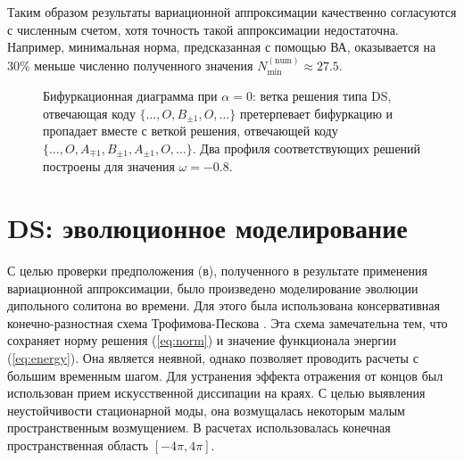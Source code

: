 Таким образом результаты вариационной аппроксимации качественно согласуются с численным счетом, хотя точность такой аппроксимации недостаточна.
Например, минимальная норма, предсказанная с помощью ВА, оказывается на $30\%$ меньше численно полученного значения $N_{\mathrm{min}}^{\mathrm{(num)}} \approx 27.5$.
%
\begin{figure}
\caption{Бифуркационная диаграмма при $\alpha = 0$: ветка решения типа DS, отвечающая коду $\{ \dots, O, B_{\pm 1}, O, \dots \}$ претерпевает бифуркацию и пропадает вместе с веткой решения, отвечающей коду $\{ \dots, O, A_{\mp 1}, B_{\pm 1}, A_{\pm 1}, O, \dots \}$. Два профиля соответствующих решений построены для значения $\omega = -0.8$.}
\label{pic:bifurcation}
\end{figure}
%

\section{DS: эволюционное моделирование}

С целью проверки предположения (в), полученного в результате применения вариационной аппроксимации, было произведено моделирование эволюции дипольного солитона во времени.
Для этого была использована консервативная конечно-разностная схема Трофимова-Пескова \cite{Trofimov}.
Эта схема замечательна тем, что сохраняет норму решения (\ref{eq:norm}) и значение функционала энергии (\ref{eq:energy}).
Она является неявной, однако позволяет проводить расчеты с большим временным шагом.
Для устранения эффекта отражения от концов был использован прием искусственной диссипации на краях.
С целью выявления неустойчивости стационарной моды, она возмущалась некоторым малым пространственным возмущением.
В расчетах использовалась конечная пространственная область $[-4\pi, 4\pi]$.

